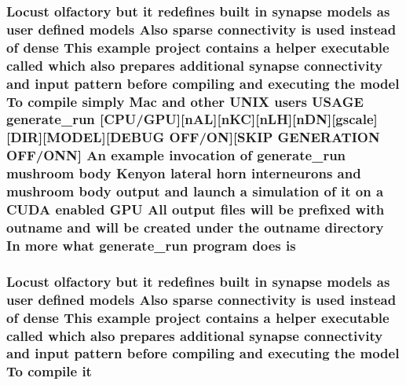 \hypertarget{userproject_2MBody__userdef__project_2README_8txt_a7b4e6cf78d14ce882cb8ff127e01babd}{
\subsubsection[{is}]{\setlength{\rightskip}{0pt plus 5cm}Locust olfactory but {\bf it} redefines built {\bf in} synapse models as user defined models Also sparse connectivity is used instead of dense This example {\bf project} contains a helper executable called which also prepares additional synapse connectivity and input pattern before compiling and executing the {\bf model} To compile simply Mac and other U\+N\+I\+X users U\+S\+A\+G\+E {\bf generate\+\_\+run} \mbox{[}{\bf C\+P\+U}/{\bf G\+P\+U}\mbox{]}\mbox{[}n\+A\+L\mbox{]}\mbox{[}n\+K\+C\mbox{]}\mbox{[}n\+L\+H\mbox{]}\mbox{[}n\+D\+N\mbox{]}\mbox{[}gscale\mbox{]}\mbox{[}D\+I\+R\mbox{]}\mbox{[}M\+O\+D\+E\+L\mbox{]}\mbox{[}D\+E\+B\+U\+G O\+F\+F/O\+N\mbox{]}\mbox{[}S\+K\+I\+P G\+E\+N\+E\+R\+A\+T\+I\+O\+N O\+F\+F/O\+N\+N\mbox{]} An example invocation of {\bf generate\+\_\+run} mushroom body Kenyon lateral horn {\bf interneurons} and mushroom body output and launch a simulation of {\bf it} on a C\+U\+D\+A enabled {\bf G\+P\+U} All output files will be prefixed {\bf with} outname and will be created under the outname {\bf directory} In more what {\bf generate\+\_\+run} program does is}}\label{userproject_2MBody__userdef__project_2README_8txt_a7b4e6cf78d14ce882cb8ff127e01babd}
\hypertarget{userproject_2MBody__userdef__project_2README_8txt_a9040a95c25c3aa700dee73c714f011d2}{
\subsubsection[{it}]{\setlength{\rightskip}{0pt plus 5cm}Locust olfactory but it redefines built {\bf in} synapse models as user defined models Also sparse connectivity {\bf is} used instead of dense This example {\bf project} contains a helper executable called which also prepares additional synapse connectivity and input pattern before compiling and executing the {\bf model} To compile it}}\label{userproject_2MBody__userdef__project_2README_8txt_a9040a95c25c3aa700dee73c714f011d2}
